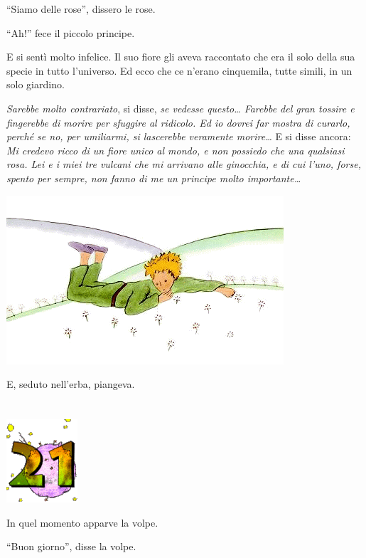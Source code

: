 \documentclass[11pt]{scrbook}
\begin{document}
``Siamo delle rose'', dissero le rose.

``Ah!'' fece il piccolo principe.

E si sentì molto infelice. Il suo fiore gli aveva raccontato che era il solo della sua specie in tutto l'universo. Ed ecco che ce n'erano cinquemila, tutte simili, in un solo giardino.

\emph{Sarebbe molto contrariato}, si disse, \emph{se vedesse questo\ldots{} Farebbe del gran tossire e fingerebbe di morire per sfuggire al ridicolo. Ed io dovrei far mostra di curarlo, perché se no, per umiliarmi, si lascerebbe veramente morire\ldots{}} E si disse ancora: \emph{Mi credevo ricco di un fiore unico al mondo, e non possiedo che una qualsiasi rosa. Lei e i miei tre vulcani che mi arrivano alle ginocchia, e di cui l'uno, forse, spento per sempre, non fanno di me un principe molto importante\ldots{}}

\begin{center}
\includegraphics{img/20b}
\end{center}

E, seduto nell'erba, piangeva.

\chapter{}
\begin{center}
\includegraphics{img/chapter21}
\end{center}

In quel momento apparve la volpe.

``Buon giorno'', disse la volpe.
\end{document}

